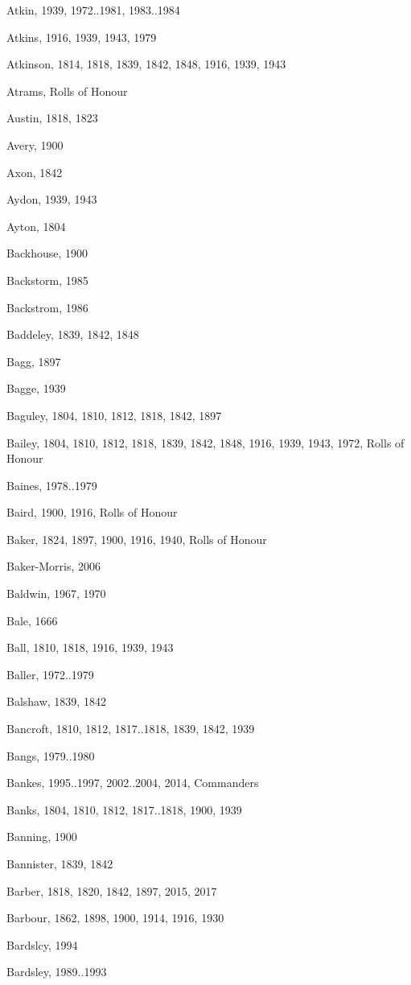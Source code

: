 {\begin{theindex}
\item Atkin, 1939, 1972..1981, 1983..1984
\item Atkins, 1916, 1939, 1943, 1979
\item Atkinson, 1814, 1818, 1839, 1842, 1848, 1916, 1939, 1943
\item Atrams, Rolls of Honour
\item Austin, 1818, 1823
\item Avery, 1900
\item Axon, 1842
\item Aydon, 1939, 1943
\item Ayton, 1804
\item Backhouse, 1900
\item Backstorm, 1985
\item Backstrom, 1986
\item Baddeley, 1839, 1842, 1848
\item Bagg, 1897
\item Bagge, 1939
\item Baguley, 1804, 1810, 1812, 1818, 1842, 1897
\item Bailey, 1804, 1810, 1812, 1818, 1839, 1842, 1848, 1916, 1939, 1943, 1972, Rolls of Honour
\item Baines, 1978..1979
\item Baird, 1900, 1916, Rolls of Honour
\item Baker, 1824, 1897, 1900, 1916, 1940, Rolls of Honour
\item Baker-Morris, 2006
\item Baldwin, 1967, 1970
\item Bale, 1666
\item Ball, 1810, 1818, 1916, 1939, 1943
\item Baller, 1972..1979
\item Balshaw, 1839, 1842
\item Bancroft, 1810, 1812, 1817..1818, 1839, 1842, 1939
\item Bangs, 1979..1980
\item Bankes, 1995..1997, 2002..2004, 2014, Commanders
\item Banks, 1804, 1810, 1812, 1817..1818, 1900, 1939
\item Banning, 1900
\item Bannister, 1839, 1842
\item Barber, 1818, 1820, 1842, 1897, 2015, 2017
\item Barbour, 1862, 1898, 1900, 1914, 1916, 1930
\item Bardslcy, 1994
\item Bardsley, 1989..1993

\end{theindex}}
